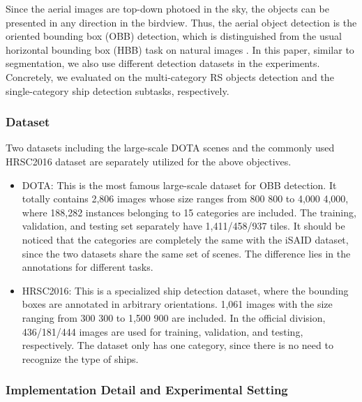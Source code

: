 \documentclass[10pt, journal,twoside]{IEEEtran}
\begin{document}
Since the aerial images are top-down photoed in the sky, the objects can be presented in any direction in the birdview. Thus, the aerial object detection is the oriented bounding box (OBB) detection, which is distinguished from the usual horizontal bounding box (HBB) task on natural images \cite{FasterRCNN,retinanet,zj_detection4}. In this paper, similar to segmentation, we also use different detection datasets in the experiments. Concretely, we evaluated on the multi-category RS objects detection and the single-category ship detection subtasks, respectively.

\subsubsection{Dataset}
Two datasets including the large-scale DOTA \cite{dota1} scenes and the commonly used HRSC2016 \cite{hrsc2016} dataset are separately utilized for the above objectives.

\begin{itemize}
  
  \item DOTA: This is the most famous large-scale dataset for OBB detection. It totally contains 2,806 images whose size ranges from 800  800 to 4,000  4,000, where 188,282 instances belonging to 15 categories are included. The training, validation, and testing set separately have 1,411/458/937 tiles. It should be noticed that the categories are completely the same with the iSAID dataset, since the two datasets share the same set of scenes. The difference lies in the annotations for different tasks.
  \item HRSC2016: This is a specialized ship detection dataset, where the bounding boxes are annotated in arbitrary orientations. 1,061 images with the size ranging from 300  300 to 1,500  900 are included. In the official division, 436/181/444 images are used for training, validation, and testing, respectively. The dataset only has one category, since there is no need to recognize the type of ships.

\end{itemize}

\subsubsection{Implementation Detail and Experimental Setting}
\end{document}
